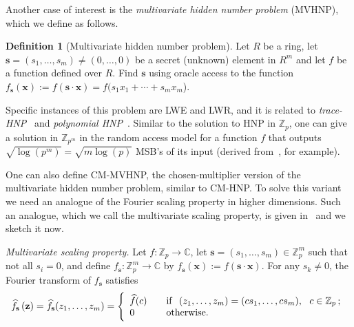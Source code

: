 \documentclass[11pt]{article}
\theoremstyle{definition}
\newtheorem{definition}[theorem]{Definition}
\newcommand{\Z}{\mathbb{Z}}
\newcommand{\C}{\mathbb{C}}
\begin{document}
Another case of interest is the \emph{multivariate hidden number problem} (MVHNP), which we define as follows.
\begin{definition} [Multivariate hidden number problem]
    \label{MVHNP_def}
    Let $R$ be a ring, let $\textbf{s}=(s_1,\dots,s_m)\ne (0,\dots,0)$ be a secret (unknown) element in $R^m$ and let $f$ be a function defined over $R$. Find $\textbf{s}$ using oracle access to the function $f_\textbf{s}(\textbf{x}) := f (\textbf{s} \cdot \textbf{x}) = f (s_1 x_1 + \cdots + s_m x_m$).
\end{definition}

Specific instances of this problem are LWE and LWR, and it is related to \emph{trace-HNP}~\cite{trace-HNP} and \emph{polynomial HNP}~\cite{Poly-HNP}. Similar to the solution to HNP in $\Z_p$, one can give a solution in $\Z_{p^m}$ in the random access model for a function $f$ that outputs $\sqrt{\log(p^m)} = \sqrt{m\log(p)}$ MSB's of its input (derived from~\cite{Poly-HNP}, for example). %

One can also define CM-MVHNP, the chosen-multiplier version of the multivariate hidden number problem, similar to CM-HNP. To solve this variant we need an analogue of the Fourier scaling property in higher dimensions. Such an analogue, which we call the multivariate scaling property, is given in~\cite[Lemma 13]{MVHNP} and we sketch it now.



\noindent\emph{Multivariate scaling property.} Let $f: \Z_p \rightarrow \C$, let $\textbf{s}=(s_1,\dots,s_m) \in \Z_p^m$ such that not all $s_i = 0$, and define $f_\textbf{s}: \Z_p^m \rightarrow \C$ by $f_\textbf{s}(\textbf{x}) := f (\textbf{s} \cdot \textbf{x})$. For any $s_k \neq 0$, the Fourier transform of $f_\textbf{s}$ satisfies
\begin{align*}
    \label{eq:MVscaling}
    \widehat{f_\textbf{s}}\left(\mathbf{z}\right) = \widehat{f_\textbf{s}}(z_1,\dots,z_m) = \left\{
    \begin{array}{l l}
        \widehat{f}(c) & \quad \mathrm{if} \ \ (z_1,\dots,z_m) = (cs_1,\dots,cs_m), \ \  c \in \Z_p \,; \\
        0              & \quad \mathrm{otherwise.}
    \end{array}
    \right.
\end{align*}
\end{document}
